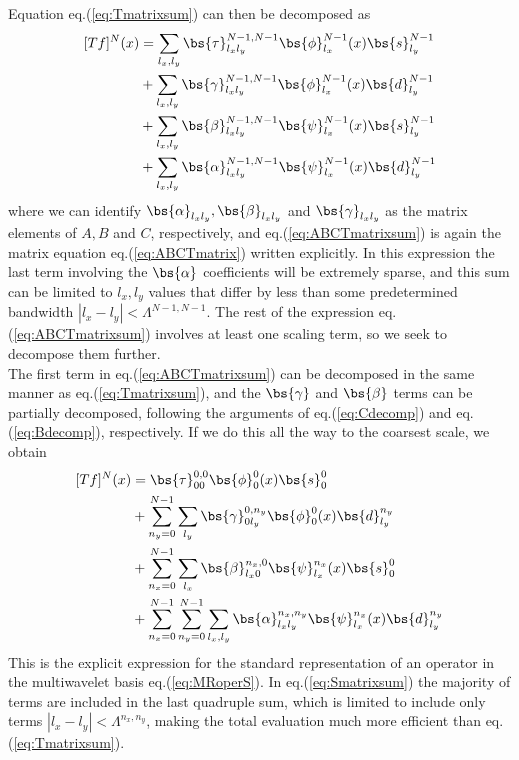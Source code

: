 Equation eq.(\ref{eq:Tmatrixsum}) can then be decomposed as
\begin{align}
	\label{eq:ABCTmatrixsum}
	\begin{split}
	[Tf]^N(x) &= \sum_{l_x,l_y}\bs{\tau}^{N-1,N-1}_{l_xl_y}
	\bs{\phi}^{N-1}_{l_x}(x) \bs{s}^{N-1}_{l_y}\\
	&+ \sum_{l_x,l_y}\bs{\gamma}^{N-1,N-1}_{l_xl_y}
	\bs{\phi}^{N-1}_{l_x}(x) \bs{d}^{N-1}_{l_y}\\
	&+ \sum_{l_x,l_y}\bs{\beta}^{N-1,N-1}_{l_xl_y}
	\bs{\psi}^{N-1}_{l_x}(x) \bs{s}^{N-1}_{l_y}\\
	&+ \sum_{l_x,l_y}\bs{\alpha}^{N-1,N-1}_{l_xl_y}
	\bs{\psi}^{N-1}_{l_x}(x) \bs{d}^{N-1}_{l_y}
	\end{split}
\end{align}
where we can identify $\bs{\alpha}_{l_xl_y}, 
\bs{\beta}_{l_xl_y}$ and 
$\bs{\gamma}_{l_xl_y}$ as the matrix elements of $A, B$ and
$C$, respectively, and eq.(\ref{eq:ABCTmatrixsum}) is again the matrix equation
eq.(\ref{eq:ABCTmatrix}) written explicitly. In this expression the last term
involving the $\bs{\alpha}$ coefficients will be extremely sparse, and 
this sum can be limited to $l_x,l_y$ values that differ by less than some 
predetermined bandwidth $|l_x-l_y| < \Lambda^{N-1,N-1}$. The rest of the 
expression eq.(\ref{eq:ABCTmatrixsum}) involves at least one scaling term, so
we seek to decompose them further.\\

\noindent
The first term in eq.(\ref{eq:ABCTmatrixsum}) can be decomposed in the same
manner as eq.(\ref{eq:Tmatrixsum}), and the $\bs{\gamma}$ and
$\bs{\beta}$ terms can be partially decomposed, following the
arguments of eq.(\ref{eq:Cdecomp}) and eq.(\ref{eq:Bdecomp}), respectively. If we do 
this all the way to the coarsest scale, we obtain
\begin{align}
	\label{eq:Smatrixsum}
	\begin{split}
	[Tf]^N(x) &= \bs{\tau}^{0,0}_{00}
	\bs{\phi}^{0}_{0}(x) \bs{s}^{0}_{0}\\
	&+ \sum_{n_y=0}^{N-1}\sum_{l_y}
	\bs{\gamma}^{0,n_y}_{0l_y}
	\bs{\phi}^{0}_{0}(x) \bs{d}^{n_y}_{l_y}\\
	&+ \sum_{n_x=0}^{N-1}\sum_{l_x}
	\bs{\beta}^{n_x,0}_{l_x0}\bs{\psi}^{n_x}_{l_x}(x) 
	\bs{s}^{0}_{0}\\
	&+ \sum_{n_x=0}^{N-1}\sum_{n_y=0}^{N-1}\sum_{l_x,l_y}
	\bs{\alpha}^{n_x,n_y}_{l_xl_y} \bs{\psi}^{n_x}_{l_x}(x) 
	\bs{d}^{n_y}_{l_y}
	\end{split}
\end{align}
This is the explicit expression for the standard representation of an operator
in the multiwavelet basis eq.(\ref{eq:MRoperS}). In eq.(\ref{eq:Smatrixsum}) the 
majority of terms are included in the last quadruple sum, which is limited to 
include only terms $|l_x-l_y| < \Lambda^{n_x,n_y}$, making the total evaluation
much more efficient than eq.(\ref{eq:Tmatrixsum}). 

